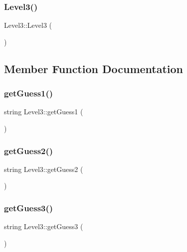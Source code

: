 \subsubsection{Level3()}
{\footnotesize\ttfamily Level3\+::\+Level3 (\begin{DoxyParamCaption}{ }\end{DoxyParamCaption})\hspace{0.3cm}{\ttfamily [inline]}}



\subsection{Member Function Documentation}
\mbox{\label{class_level3_a2b4a44fc48effa516fdf32e9629a9b23}} 
\subsubsection{getGuess1()}
{\footnotesize\ttfamily string Level3\+::get\+Guess1 (\begin{DoxyParamCaption}{ }\end{DoxyParamCaption})\hspace{0.3cm}{\ttfamily [inline]}}

\mbox{\label{class_level3_aa2ad9fa4bc7f5c124c23a8002c75b475}} 
\subsubsection{getGuess2()}
{\footnotesize\ttfamily string Level3\+::get\+Guess2 (\begin{DoxyParamCaption}{ }\end{DoxyParamCaption})\hspace{0.3cm}{\ttfamily [inline]}}

\mbox{\label{class_level3_af33866cc48e62697affc0a2ffdb2f0d9}} 
\subsubsection{getGuess3()}
{\footnotesize\ttfamily string Level3\+::get\+Guess3 (\begin{DoxyParamCaption}{ }\end{DoxyParamCaption})\hspace{0.3cm}{\ttfamily [inline]}}


